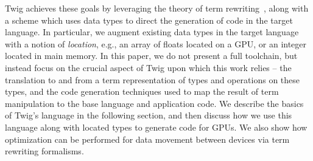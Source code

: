 Twig achieves these goals by leveraging the theory of term
rewriting~\cite{baader98rewriting}, along with a scheme which uses data types to
direct the generation of code in the target language. In particular, we augment
existing data types in the target language with a notion of \emph{location},
e.g., an array of floats located on a GPU, or an integer located in main memory.
In this paper, we do not present a full toolchain, but instead focus on the
crucial aspect of Twig upon which this work relies -- the translation to and
from a term representation of types and operations on these types, and the code
generation techniques used to map the result of term manipulation to the base
language and application code. We describe the basics of Twig's language in the
following section, and then discuss how we use this language along with located
types to generate code for GPUs. We also show how optimization can be performed
for data movement between devices via term rewriting formalisms.



